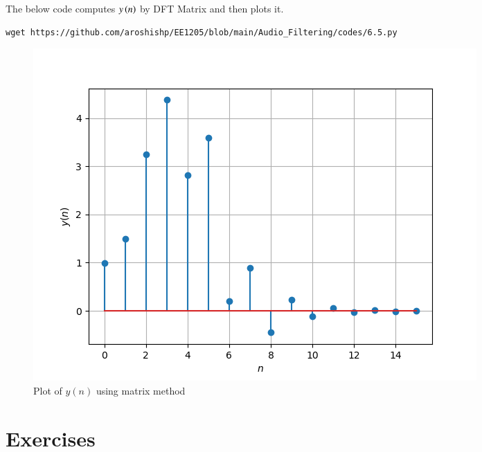 \documentclass[journal,12pt,twocolumn]{IEEEtran}
\theoremstyle{remark}
\renewcommand\thesection{\arabic{section}}
\numberwithin{equation}{subsection}
\begin{document}
\begin{enumerate}[label=\thesection.\arabic*]
The below code computes $y\left(n\right)$ by DFT Matrix and then plots it.
\begin{lstlisting}
wget https://github.com/aroshishp/EE1205/blob/main/Audio_Filtering/codes/6.5.py
\end{lstlisting}
\begin{figure}[!h]
    \centering
    \includegraphics[width = \columnwidth]{figs/6.5.png}
    \caption{Plot of $y(n)$ using matrix method}
    \label{fig:enter-la}
\end{figure}
\end{enumerate}
\section{Exercises}
\end{document}
